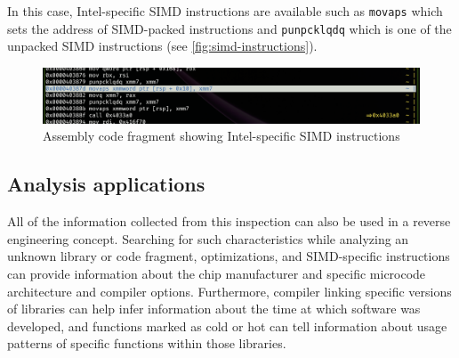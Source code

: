 In this case, Intel-specific SIMD instructions are available such as \verb|movaps| which sets the address of SIMD-packed instructions and \verb|punpcklqdq| which is one of the unpacked SIMD instructions \cite{intel_corporation_intel_2024} (see \autoref{fig:simd-instructions}).

\begin{figure}
    \centering
    \includegraphics[width=1\linewidth]{arch-specific-instruction.png}
    \caption{Assembly code fragment showing Intel-specific SIMD instructions}
    \label{fig:simd-instructions}
\end{figure}

\subsection{Analysis applications}
All of the information collected from this inspection can also be used in a reverse engineering concept.
Searching for such characteristics while analyzing an unknown library or code fragment, optimizations, and SIMD-specific instructions can provide information about the chip manufacturer and specific microcode architecture and compiler options.
Furthermore, compiler linking specific versions of libraries can help infer information about the time at which software was developed, and functions marked as cold or hot can tell information about usage patterns of specific functions within those libraries.